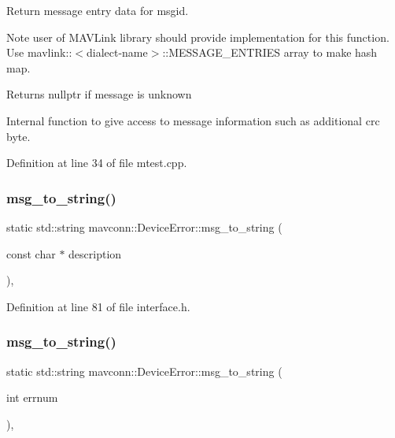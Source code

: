 Return message entry data for msgid.

\begin{DoxyNote}{Note}
user of M\+A\+V\+Link library should provide implementation for this function. Use mavlink\+:\+:$<$dialect-\/name$>$\+::\+M\+E\+S\+S\+A\+G\+E\+\_\+\+E\+N\+T\+R\+I\+ES array to make hash map.
\end{DoxyNote}
\begin{DoxyReturn}{Returns}
nullptr if message is unknown
\end{DoxyReturn}
Internal function to give access to message information such as additional crc byte. 

Definition at line 34 of file mtest.\+cpp.

\mbox{\label{group__mavconn_gae998ec92e731b23abc43286b88fa84ca}} 
\subsubsection{\texorpdfstring{msg\_to\_string()}{msg\_to\_string()}\hspace{0.1cm}{\footnotesize\ttfamily [1/3]}}
{\footnotesize\ttfamily static std\+::string mavconn\+::\+Device\+Error\+::msg\+\_\+to\+\_\+string (\begin{DoxyParamCaption}\item[{const char $\ast$}]{description }\end{DoxyParamCaption})\hspace{0.3cm}{\ttfamily [inline]}, {\ttfamily [static]}}



Definition at line 81 of file interface.\+h.

\mbox{\label{group__mavconn_ga0422d27d75fd22d67cc678d9b92f9d95}} 
\subsubsection{\texorpdfstring{msg\_to\_string()}{msg\_to\_string()}\hspace{0.1cm}{\footnotesize\ttfamily [2/3]}}
{\footnotesize\ttfamily static std\+::string mavconn\+::\+Device\+Error\+::msg\+\_\+to\+\_\+string (\begin{DoxyParamCaption}\item[{int}]{errnum }\end{DoxyParamCaption})\hspace{0.3cm}{\ttfamily [inline]}, {\ttfamily [static]}}



